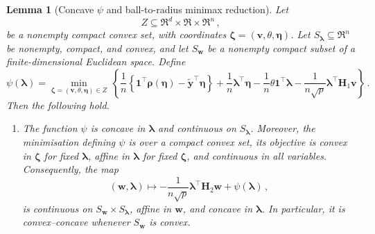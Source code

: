\documentclass{article}
\newtheorem{lemma}{Lemma}
\theoremstyle{definition}
\newcommand*{\bb}{\boldsymbol}
\def\bw {\bb{w}}
\def\bH {\bb{H}}
\def\bv{\bb{v}}
\def\bYtil{\widetilde{\bb{y}}}
\def\bH{\bb{H}}
\def\blambda{\bb{\lambda}}
\begin{document}
\begin{bibunit}



\begin{lemma}[Concave $\psi$ and ball-to-radius minimax reduction]
	\label{lemma:psi_conv_conc}
	Let
	$$
		Z
		\subseteq
		\Re^d\times\Re\times\Re^n\,,
	$$
	be a nonempty compact convex set, with coordinates
	$\bb\zeta=(\bv,\theta,\bb\eta)$. Let
	$S_{\blambda}\subseteq\Re^n$ be nonempty, compact, and convex, and let
	$S_{\bw}$ be a nonempty compact subset of a finite-dimensional Euclidean
	space. Define
	\begin{equation}
		\label{eq:psi_conv_conc_def}
		\psi(\blambda)
		=
		\underset{\bb\zeta=(\bv,\theta,\bb\eta)\in Z}{\min} \,
		\left\{
			\frac{1}{n}
			\left\{
				\bb 1^\top\bb\rho(\bb\eta)
				-
				\bYtil^\top\bb\eta
			\right\}
			+
			\frac{1}{n}
			\blambda^\top\bb\eta
			-
			\frac{1}{n}
			\theta\bb 1^\top\blambda
			-
			\frac{1}{n\sqrt p}
			\blambda^\top\bH_1\bv
		\right\} \,.
	\end{equation}
	Then the following hold.
	\begin{enumerate}[label=(\roman*),ref=\thelemma(\roman*)]
		\item \label{lemma:psi_conv_conc_concavity} The function $\psi$ is concave in $\blambda$ and continuous on $S_{\blambda}$. Moreover, the minimisation defining $\psi$ is over a compact convex set, its objective is convex in $\bb\zeta$ for fixed $\blambda$, affine in $\blambda$ for fixed $\bb\zeta$, and continuous in all variables. Consequently, the map
		\begin{equation}
			\label{eq:psi_conv_conc_po_map}
			(\bw,\blambda)
			\mapsto
			-
			\frac{1}{n\sqrt p}
			\blambda^\top\bH_2\bw
			+
			\psi(\blambda)\,,
		\end{equation}
		is continuous on $S_{\bw}\times S_{\blambda}$, affine in $\bw$, and
		concave in $\blambda$. In particular, it is convex--concave whenever
		$S_{\bw}$ is convex.


\end{enumerate}
\end{lemma}
\end{bibunit}
\end{document}
